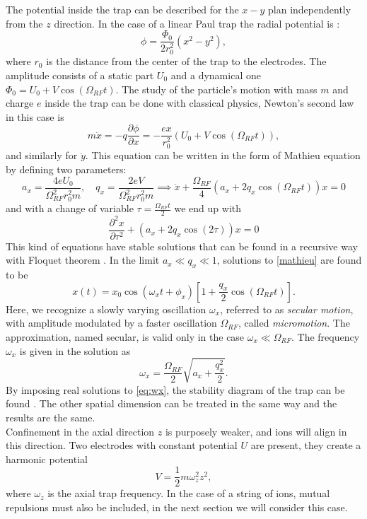 The potential inside the trap can be described for the $x-y$ plan independently from the $z$ direction. In the case of a linear Paul trap the radial potential is \cite{traptheory}:
\begin{equation}
\phi  = \frac{\Phi_0}{2r_0^2}\left(x^2 - y^2\right),
\end{equation}
where $r_0$ is the distance from the center of the trap to the electrodes. The amplitude consists of a static part $U_0$ and a dynamical one $\Phi_0 = U_0 + V \cos(\Omega_{RF} t)$.
The study of the particle's motion with mass $m$ and charge $e$ inside the trap can be done with classical physics, Newton's second law in this case is
\begin{equation}
m\ddot{x} = -q \frac{\partial \phi}{\partial x} = - \frac{ex}{r_0^2}\left(U_0 + V \cos(\Omega_{RF} t) \right),
\end{equation}
and similarly for $\ddot{y}$. This equation can be written in the form of Mathieu equation \cite{Richards1983} by defining two parameters:
\begin{equation}
a_x = \frac{4eU_0}{\Omega_{RF}^2r_0^2m}, \quad q_x = \frac{2eV}{\Omega_{RF}^2r_0^2m} \implies \ddot{x} +\frac{\Omega_{RF}}{4} \left(a_x + 2q_x \cos(\Omega_{RF} t )\right)x = 0
\end{equation}
and with a change of variable $\tau = \frac{\Omega_{RF} t}{2}$ we end up with
\begin{equation}
\label{mathieu}
\frac{\partial^2 x}{\partial \tau^2}+\left(a_x + 2q_x \cos(2\tau)\right)x = 0
\end{equation}
This kind of equations have stable solutions that can be found in a recursive way with Floquet theorem \cite{iondynamic}. In the limit $a_x \ll q_x \ll 1$, solutions to \eqref{mathieu} are found to be
\begin{equation}
x(t) = x_0 \cos(\omega_x t +\phi_x)\left[1 + \frac{q_x}{2}\cos(\Omega_{RF} t) \right].
\end{equation}
Here, we recognize a slowly varying oscillation $\omega_x$, referred to as \emph{secular motion}, with amplitude modulated by a faster oscillation $\Omega_{RF}$, called \emph{micromotion}. The approximation, named secular, is valid only in the case $\omega_x \ll \Omega_{RF}$. The frequency $\omega_x$ is given in the solution as
\begin{equation}
\label{eq:wx}
\omega_x = \frac{\Omega_{RF}}{2}\sqrt{a_x + \frac{q_x^2}{2}}.
\end{equation}
By imposing real solutions to \eqref{eq:wx}, the stability diagram of the trap can be found \cite{traptheory}. The other spatial dimension can be treated in the same way and the results are the same.\\
Confinement in the axial direction $z$ is purposely weaker, and ions will align in this direction. Two electrodes with constant potential $U$ are present, they create a harmonic potential
\begin{equation}
V = \frac{1}{2}m\omega_z^2z^2,
\end{equation}
where $\omega_z$ is the axial trap frequency. In the case of a string of ions, mutual repulsions must also be included, in the next section we will consider this case.

